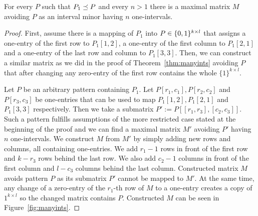 \begin{thm}
For every $P$ such that $P_1\preceq P$ and every $n>1$ there is a maximal matrix $M$ avoiding $P$ as an interval minor having $n$ one-intervals.
\end{thm}
\begin{proof}
First, assume there is a mapping of $P_1$ into $P\in\{0,1\}^{k\times l}$ that assigns a one-entry of the first row to $P_1[1,2]$, a one-entry of the first column to $P_1[2,1]$ and a one-entry of the last row and column to $P_1[3,3]$. Then, we can construct a similar matrix as we did in the proof of Theorem~\ref{thm:manyints} avoiding $P$ that after changing any zero-entry of the first row contains the whole $\{1\}^{k\times l}$.

Let $P$ be an arbitrary pattern containing $P_1$. Let $P[r_1,c_1],P[r_2,c_2]$ and $P[r_3,c_3]$ be one-entries that can be used to map $P_1[1,2],P_1[2,1]$ and $P_1[3,3]$ respectively. Then we take a submatrix $P':=P[[r_1,r_3],[c_2,c_3]]$. Such a pattern fulfills assumptions of the more restricted case stated at the beginning of the proof and we can find a maximal matrix $M'$ avoiding $P'$ having $n$ one-intervals. We construct $M$ from $M'$ by simply adding new rows and columns, all containing one-entries. We add $r_1-1$ rows in front of the first row and $k-r_3$ rows behind the last row. We also add $c_2-1$ columns in front of the first column and $l-c_3$ columns behind the last column. Constructed matrix $M$ avoids pattern $P$ as its submatrix $P'$ cannot be mapped to $M'$. At the same time, any change of a zero-entry of the $r_1$-th row of $M$ to a one-entry creates a copy of ${1}^{k\times l}$ so the changed matrix contains $P$. Constructed $M$ can be seen in Figure~\ref{fig:manyints}.


\end{proof}
